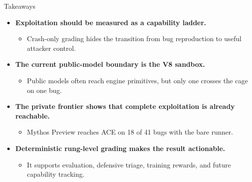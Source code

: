 \documentclass[aspectratio=169,t]{beamer}
\begin{document}
\begin{frame}{Takeaways}
  \begin{itemize}
    \item \textbf{Exploitation should be measured as a capability ladder.}
      \begin{itemize}
        \item Crash-only grading hides the transition from bug reproduction to useful attacker control.
      \end{itemize}
    \item \textbf{The current public-model boundary is the V8 sandbox.}
      \begin{itemize}
        \item Public models often reach engine primitives, but only one crosses the cage on one bug.
      \end{itemize}
    \item \textbf{The private frontier shows that complete exploitation is already reachable.}
      \begin{itemize}
        \item Mythos Preview reaches ACE on 18 of 41 bugs with the bare runner.
      \end{itemize}
    \item \textbf{Deterministic rung-level grading makes the result actionable.}
      \begin{itemize}
        \item It supports evaluation, defensive triage, training rewards, and future capability tracking.
      \end{itemize}
  \end{itemize}

\end{frame}
\end{document}
